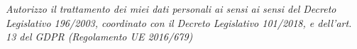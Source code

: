 \documentclass{moderncv}
\begin{document}

\vspace*{\fill}
\textit{\footnotesize Autorizzo il trattamento dei miei dati personali ai sensi ai sensi del 
Decreto Legislativo 196/2003, coordinato con il Decreto Legislativo 101/2018, 
e dell'art. 13 del GDPR (Regolamento UE 2016/679)}
\end{document}
